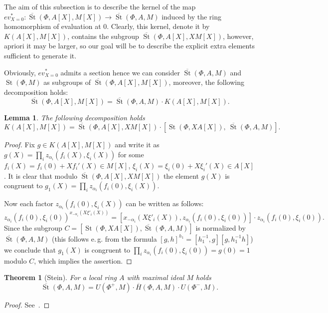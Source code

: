 \documentclass[oneside, 8pt]{amsart}
\newtheorem{theorem}{Theorem}
\newtheorem{lemma}{Lemma}
\theoremstyle{remark}
\theoremstyle{definition}
\DeclareMathOperator{\St}{St}
\numberwithin{equation}{section}
\begin{document}
The aim of this subsection is to describe the kernel of the map $ev_{X=0}^*\colon\overline{\St}(\Phi, A[X], M[X]) \to \overline{\St}(\Phi, A, M)$
induced by the ring homomorphism of evaluation at $0$. Clearly, this kernel, denote it by $K(A[X], M[X])$, contains the subgroup $\overline{\St}(\Phi, A[X], XM[X])$, however, apriori it may be larger, so our goal will be to describe the explicit extra elements sufficient to generate it.

Obviously, $ev_{X=0}^*$ admits a section hence we can consider $\overline{\St}(\Phi, A, M)$ and $\St(\Phi, M)$ as subgroups of $\overline{\St}(\Phi, A[X], M[X])$,
 moreover, the following decomposition holds:
\begin{equation} \label{relZero-decomp} \overline{\St}(\Phi, A[X], M[X]) = \overline{\St}(\Phi, A, M) \cdot K(A[X], M[X]).\end{equation}
\begin{lemma} 
The following decomposition holds
 \[ K(A[X], M[X]) = \overline{\St}(\Phi, A[X], XM[X]) \cdot \left[\St(\Phi, XA[X]),\ \overline{\St}(\Phi, A, M)\right].\] 
\end{lemma}
\begin{proof}
 Fix $g \in K(A[X], M[X])$ and write it as $g(X) = \prod_i z_{\alpha_i}(f_i(X), \xi_i(X))$ for some $f_i(X) = f_i(0) + Xf_i'(X) \in M[X]$, $\xi_i(X) = \xi_i(0) + X\xi_i'(X) \in A[X]$.
 It is clear that modulo $\overline{\St}(\Phi, A[X], XM[X])$ the element $g(X)$ is congruent to $g_1(X) = \prod_i z_{\alpha_i}(f_i(0), \xi_i(X)).$ 
 
 Now each factor $z_{\alpha_i}(f_i(0), \xi_i(X))$ can be written as follows:
 \[z_{\alpha_i}(f_i(0), \xi_i(0))^{x_{-\alpha_i}(X\xi'_i(X))} = [x_{-\alpha_i}(X\xi'_i(X)), z_{\alpha_i}(f_i(0), \xi_i(0))] \cdot z_{\alpha_i}(f_i(0), \xi_i(0)).\]
 Since the subgroup $C = \left[\St(\Phi, XA[X]), \overline{\St}(\Phi, A, M)\right]$ is normalized by $\overline{\St}(\Phi, A, M)$ 
 (this follows e.\,g. from the formula $[g, h]^{h_1} = [h_1^{-1}, g][g, h_1^{-1}h]$) we conclude that $g_1(X)$ is congruent to $\prod_i z_{\alpha_i}(f_i(0), \xi_i(0)) = g(0) = 1$ modulo $C$,
 which implies the assertion. \qedhere
\end{proof}

 \begin{theorem}[Stein] \label{thmStein} For a local ring $A$ with maximal ideal $M$ holds \[\overline{\St}(\Phi, A, M) = U(\Phi^+, M) \cdot \overline{H}(\Phi, A, M) \cdot U(\Phi^-, M).\] \end{theorem} \begin{proof} See~\cite[Theorem~2.4]{Ste73}. \end{proof}
\end{document}
